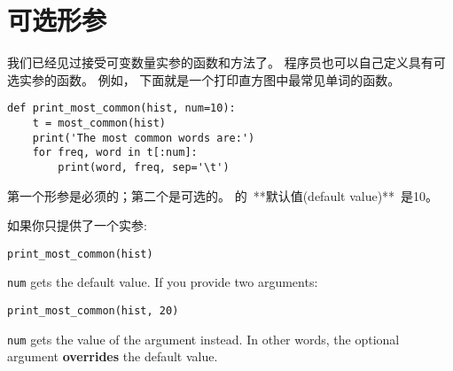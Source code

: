 \section{可选形参}



我们已经见过接受可变数量实参的函数和方法了。
程序员也可以自己定义具有可选实参的函数。
例如， 下面就是一个打印直方图中最常见单词的函数。


\begin{lstlisting}
def print_most_common(hist, num=10):
    t = most_common(hist)
    print('The most common words are:')
    for freq, word in t[:num]:
        print(word, freq, sep='\t')
\end{lstlisting}


第一个形参是必须的；第二个是可选的。    的\ **默认值(default
value)**\ 是10。



如果你只提供了一个实参:

\begin{lstlisting}
print_most_common(hist)
\end{lstlisting}
{\tt num} gets the default value.  If you provide two arguments:
\begin{lstlisting}
print_most_common(hist, 20)
\end{lstlisting}
{\tt num} gets the value of the argument instead.  In other
words, the optional argument {\bf overrides} the default value.



